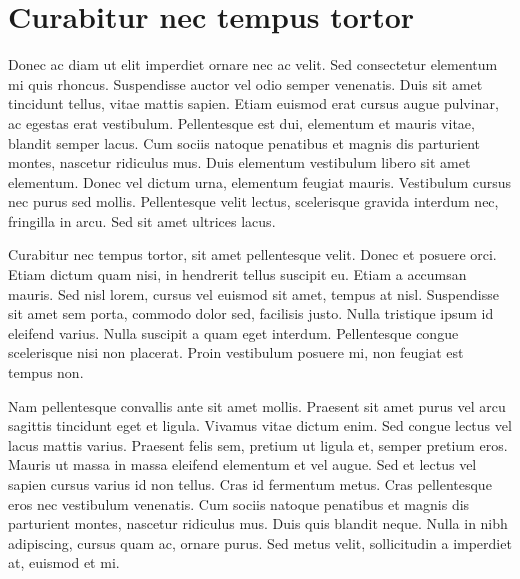 \chapter{Curabitur nec tempus tortor}

Donec ac diam ut elit imperdiet ornare nec ac velit. Sed consectetur elementum mi quis rhoncus. Suspendisse auctor vel odio semper venenatis. Duis sit amet tincidunt tellus, vitae mattis sapien. Etiam euismod erat cursus augue pulvinar, ac egestas erat vestibulum. Pellentesque est dui, elementum et mauris vitae, blandit semper lacus. Cum sociis natoque penatibus et magnis dis parturient montes, nascetur ridiculus mus. Duis elementum vestibulum libero sit amet elementum. Donec vel dictum urna, elementum feugiat mauris. Vestibulum cursus nec purus sed mollis. Pellentesque velit lectus, scelerisque gravida interdum nec, fringilla in arcu. Sed sit amet ultrices lacus.

Curabitur nec tempus tortor, sit amet pellentesque velit. Donec et posuere orci. Etiam dictum quam nisi, in hendrerit tellus suscipit eu. Etiam a accumsan mauris. Sed nisl lorem, cursus vel euismod sit amet, tempus at nisl. Suspendisse sit amet sem porta, commodo dolor sed, facilisis justo. Nulla tristique ipsum id eleifend varius. Nulla suscipit a quam eget interdum. Pellentesque congue scelerisque nisi non placerat. Proin vestibulum posuere mi, non feugiat est tempus non.

Nam pellentesque convallis ante sit amet mollis. Praesent sit amet purus vel arcu sagittis tincidunt eget et ligula. Vivamus vitae dictum enim. Sed congue lectus vel lacus mattis varius. Praesent felis sem, pretium ut ligula et, semper pretium eros. Mauris ut massa in massa eleifend elementum et vel augue. Sed et lectus vel sapien cursus varius id non tellus. Cras id fermentum metus. Cras pellentesque eros nec vestibulum venenatis. Cum sociis natoque penatibus et magnis dis parturient montes, nascetur ridiculus mus. Duis quis blandit neque. Nulla in nibh adipiscing, cursus quam ac, ornare purus. Sed metus velit, sollicitudin a imperdiet at, euismod et mi. 